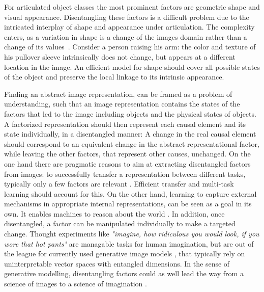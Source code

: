 	For articulated object classes the most prominent factors are geometric shape and visual appearance.
	Disentangling these factors is a difficult problem due to the intricated interplay of shape and appearance under articulation.
	The complexity enters, as a variation in shape is a change of the images domain rather than a change of its values~\cite{Shu:2018ua}.
	Consider a person raising his arm: the color and texture of his pullover sleeve intrinsically does not change, but appears at a different location in the image. An efficient model for shape should cover all possible states of the object and preserve the local linkage to its intrinsic appearance.

	Finding an abstract image representation, can be framed as a problem of understanding, such that an image representation contains the states of the factors that led to the image including objects and the physical states of objects.
	A factorized representation should then represent each causal element and its state individually, in a disentangled manner: A change in the real causal element should correspond to an equivalent change in the abstract representational factor, while leaving the other factors, that represent other causes, unchanged.
	On the one hand there are pragmatic reasons to aim at extracting disentangled factors from images: to successfully transfer a representation between different tasks, typically only a few factors are relevant \cite{Bengio:2013bu}.
	Efficient transfer and multi-task learning should account for this.
	On the other hand, learning to capture external mechanisms in appropriate internal representations, can be seen as a goal in its own.
	It enables machines to reason about the world \cite{Pearl:2018im}.
	In addition, once disentangled, a factor can be manipulated individually to make a targeted change.
	Thought experiments like \textit{"imagine, how ridiculous you would look, if you wore that hot pants"} are managable tasks for human imagination, but are out of the league for currently used generative image models \cite{Goodfellow:2014td, Kingma:2013tz}, that typically rely on uninterpretable vector spaces with entangled dimensions.
	In the sense of generative modelling, disentangling factors could as well lead the way from a science of images to a science of imagination \cite{Mahadevan:2018tz}.

